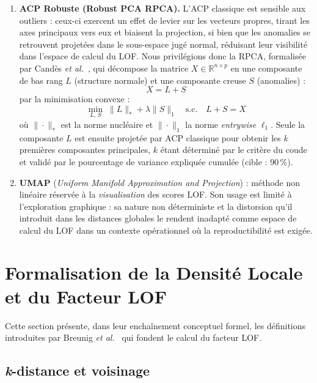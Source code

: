 \documentclass[12pt, a4paper]{article}
\begin{document}
\begin{enumerate}
    \item \textbf{ACP Robuste (Robust PCA  RPCA).}
    L'ACP classique est sensible aux outliers : ceux-ci exercent un effet de
    levier sur les vecteurs propres, tirant les axes principaux vers eux et
    biaisent la projection, si bien que les anomalies se retrouvent projetées
    dans le sous-espace jugé \og{}normal\fg{}, réduisant leur visibilité dans
    l'espace de calcul du LOF. Nous privilégions donc la RPCA, formalisée par
    Candès \textit{et al.}~\cite{candes2011rpca}, qui décompose la matrice
    $X \in \mathbb{R}^{n \times p}$ en une composante de bas rang $L$
    (structure normale) et une composante creuse $S$ (anomalies) :
    \[
        X = L + S
    \]
    par la minimisation convexe :
    \[
        \min_{L,\,S} \; \|L\|_* + \lambda\|S\|_1
        \quad \text{s.c.} \quad L + S = X
    \]
    où $\|\cdot\|_*$ est la norme nucléaire et $\|\cdot\|_1$ la norme
    \textit{entrywise} $\ell_1$. Seule la composante $L$ est ensuite
    projetée par ACP classique pour obtenir les $k$ premières composantes
    principales, $k$ étant déterminé par le critère du coude et validé par
    le pourcentage de variance expliquée cumulée (cible : $90\,\%$).

    \item \textbf{UMAP} (\textit{Uniform Manifold Approximation and
    Projection}) : méthode non linéaire réservée à la \textit{visualisation}
    des scores LOF. Son usage est limité à l'exploration graphique : sa nature
    non déterministe et la distorsion qu'il introduit dans les distances
    globales le rendent inadapté comme espace de calcul du LOF dans un
    contexte opérationnel où la reproductibilité est exigée.
\end{enumerate}

\section{Formalisation de la Densité Locale et du Facteur LOF}
\label{sec:lof_formel}

Cette section présente, dans leur enchaînement conceptuel formel,
les définitions introduites par Breunig \textit{et al.}~\cite{breunig2000lof}
qui fondent le calcul du facteur LOF.

\subsection{\textit{k}-distance et voisinage}
\label{subsec:kdistance}
\end{document}
